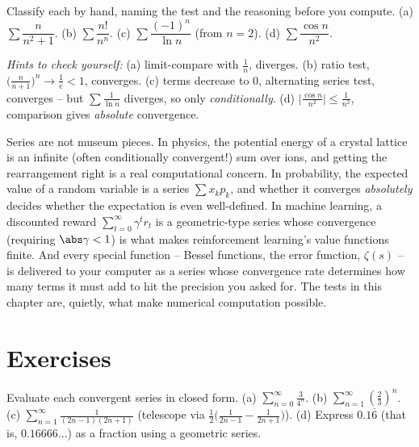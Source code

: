 \begin{labbox}
Classify each by hand, naming the test and the reasoning before you compute. (a) $\sum \dfrac{n}{n^2+1}$. \;(b) $\sum \dfrac{n!}{n^n}$. \;(c) $\sum \dfrac{(-1)^n}{\ln n}$ (from $n=2$). \;(d) $\sum \dfrac{\cos n}{n^2}$.

\emph{Hints to check yourself:} (a) limit-compare with $\tfrac1n$, diverges. (b) ratio test, $\big(\tfrac{n}{n+1}\big)^n \to \tfrac1e<1$, converges. (c) terms decrease to $0$, alternating series test, converges -- but $\sum\tfrac{1}{\ln n}$ diverges, so only \emph{conditionally}. (d) $\big|\tfrac{\cos n}{n^2}\big|\le \tfrac{1}{n^2}$, comparison gives \emph{absolute} convergence.
\end{labbox}

\begin{applicationbox}
Series are not museum pieces. In physics, the potential energy of a crystal lattice is an infinite (often conditionally convergent!) sum over ions, and getting the rearrangement right is a real computational concern. In probability, the expected value of a random variable is a series $\sum x_k p_k$, and whether it converges \emph{absolutely} decides whether the expectation is even well-defined. In machine learning, a discounted reward $\sum_{t=0}^\infty \gamma^t r_t$ is a geometric-type series whose convergence (requiring $\abs\gamma<1$) is what makes reinforcement learning's value functions finite. And every special function -- Bessel functions, the error function, $\zeta(s)$ -- is delivered to your computer as a series whose convergence rate determines how many terms it must add to hit the precision you asked for. The tests in this chapter are, quietly, what make numerical computation possible.
\end{applicationbox}

\section{Exercises}
\label{ch29:exercises}

\begin{exercise}
Evaluate each convergent series in closed form.
(a) $\displaystyle\sum_{n=0}^\infty \frac{3}{4^n}$. \quad
(b) $\displaystyle\sum_{n=1}^\infty \left(\frac{2}{3}\right)^{n}$. \quad
(c) $\displaystyle\sum_{n=1}^\infty \frac{1}{(2n-1)(2n+1)}$ (telescope via $\tfrac12\big(\tfrac{1}{2n-1}-\tfrac{1}{2n+1}\big)$). \quad
(d) Express $0.1\overline{6}$ (that is, $0.16666\ldots$) as a fraction using a geometric series.
\end{exercise}

